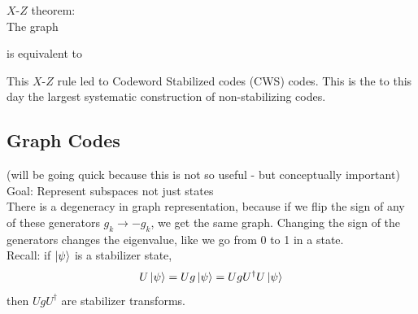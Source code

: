\begin{example}
    $X$-$Z$ theorem: \\
    The graph 
    is equivalent to 
\end{example}

This $X$-$Z$ rule led to Codeword Stabilized codes (CWS) codes. This is the to this day the largest systematic construction of non-stabilizing codes.



\subsection{Graph Codes}
(will be going quick because this is not so useful - but conceptually important) \\ 
Goal: Represent subspaces not just states \\
There is a degeneracy in graph representation, because if we flip the sign of any of these generators $g_k \rightarrow -g_k$, we get the same graph. Changing the sign of the generators changes the eigenvalue, like we go from 0 to 1 in a state.  \\
Recall: if $\ket{\psi}$ is a stabilizer state, 
\begin{equation}
    U \ket{\psi} = Ug \ket{\psi} = Ug U^\dagger U \ket{\psi} 
\end{equation}
then $UgU^\dagger$ are stabilizer transforms.

